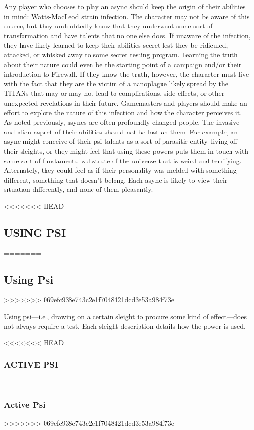 Any player who chooses to play an async should keep
the origin of their abilities in mind: Watts-MacLeod
strain infection. The character may not be aware of
this source, but they undoubtedly know that they underwent
some sort of transformation and have talents
that no one else does. If unaware of the infection, they
have likely learned to keep their abilities secret lest
they be ridiculed, attacked, or whisked away to some
secret testing program. Learning the truth about their
nature could even be the starting point of a campaign
and/or their introduction to Firewall. If they know the
truth, however, the character must live with the fact
that they are the victim of a nanoplague likely spread
by the TITANs that may or may not lead to complications,
side effects, or other unexpected revelations in
their future.
Gamemasters and players should make an effort
to explore the nature of this infection and how the
character perceives it. As noted previously, asyncs are
often profoundly-changed people. The invasive and
alien aspect of their abilities should not be lost on
them. For example, an async might conceive of their
psi talents as a sort of parasitic entity, living off their
sleights, or they might feel that using these powers
puts them in touch with some sort of fundamental
substrate of the universe that is weird and terrifying.
Alternately, they could feel as if their personality was
melded with something different, something that
doesn’t belong. Each async is likely to view their situation
differently, and none of them pleasantly.

<<<<<<< HEAD
\subsection{USING PSI}
=======
\subsection{Using Psi}
>>>>>>> 069efc938e743c2e1f7048421dcd3e53a984f73e

Using psi—i.e., drawing on a certain sleight to procure
some kind of effect—does not always require a
test. Each sleight description details how the power
is used.

<<<<<<< HEAD
\subsubsection{ACTIVE PSI}
=======
\subsubsection{Active Psi}
>>>>>>> 069efc938e743c2e1f7048421dcd3e53a984f73e

